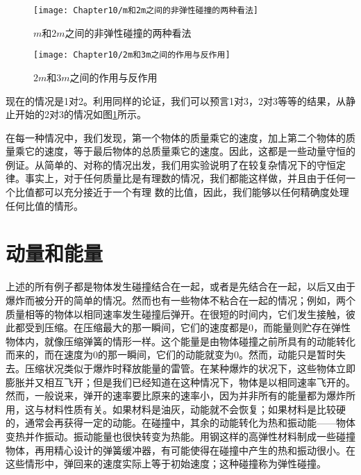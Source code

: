 \begin{figure}[htbp]
    \centering
    \begin{minipage}[t]{0.4\textwidth}
        \centering
        \texttt{[image: Chapter10/m和2m之间的非弹性碰撞的两种看法]}
        \caption{$m$和$2m$之间的非弹性碰撞的两种看法}
        \label{figure:m和2m之间的非弹性碰撞的两种看法}
    \end{minipage}
    \begin{minipage}[t]{0.4\textwidth}
        \centering
        \texttt{[image: Chapter10/2m和3m之间的作用与反作用]}    
        \caption{$2m$和$3m$之间的作用与反作用}
        \label{figure:2m和3m之间的作用与反作用}
    \end{minipage}
\end{figure}

现在的情况是1对2。利用同样的论证，我们可以预言1对3，2对3等等的结果，从静止开始的2对3的情况如图\ref{figure:2m和3m之间的作用与反作用}所示。

在每一种情况中，我们发现，第一个物体的质量乘它的速度，加上第二个物体的质量乘它的速度，等于最后物体的总质量乘它的速度。因此，这都是一些动量守恒的例证。从简单的、对称的情况出发，我们用实验说明了在较复杂情况下的守恒定律。事实上，对于任何质量比是有理数的情况，我们都能这样做，并且由于任何一个比值都可以充分接近于一个有理 数的比值，因此，我们能够以任何精确度处理任何比值的情形。

\section{动量和能量}

上述的所有例子都是物体发生碰撞结合在一起，或者是先结合在一起，以后又由于爆炸而被分开的简单的情况。然而也有一些物体不粘合在一起的情况；例如，两个质量相等的物体以相同速率发生碰撞后弹开。在很短的时间内，它们发生接触，彼此都受到压缩。在压缩最大的那一瞬间，它们的速度都是0，而能量则贮存在弹性物体内，就像压缩弹簧的情形一样。这个能量是由物体碰撞之前所具有的动能转化而来的，而在速度为0的那一瞬间，它们的动能就变为0。然而，动能只是暂时失去。压缩状况类似于爆炸时释放能量的雷管。在某种爆炸的状况下，这些物体立即膨胀并又相互飞开；但是我们已经知道在这种情况下，物体是以相同速率飞开的。然而，一般说来，弹开的速率要比原来的速率小，因为并非所有的能量都为爆炸所用，这与材料性质有关。如果材料是油灰，动能就不会恢复；如果材料是比较硬的，通常会再获得一定的动能。在碰撞中，其余的动能转化为热和振动能——物体变热并作振动。振动能量也很快转变为热能。用钢这样的高弹性材料制成一些碰撞物体，再用精心设计的弹簧缓冲器，有可能使得在碰撞中产生的热和振动很小。在这些情形中，弹回来的速度实际上等于初始速度；这种碰撞称为弹性碰撞。

